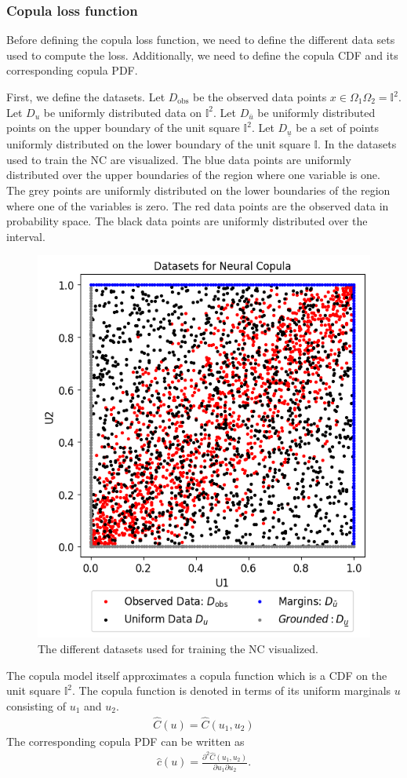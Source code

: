 
\subsubsection{Copula loss function}\label{sec:NeuralCopulaLoss}
Before defining the copula loss function, we need to define the different data sets used to compute the loss. Additionally, we need to define the copula \gls{CDF} and its corresponding copula \gls{PDF}. 

First, we define the datasets. Let $D_{\mathrm{obs}}$ be the observed data points $x \in \Omega_1\Omega_2  = \mathbb{I}^2$. Let $D_{u}$ be uniformly distributed data on $\mathbb{I}^2$. Let $D_{\bar{u}}$ be uniformly distributed points on the upper boundary of the unit square $\mathbb{I}^2$. Let $D_{\underline{u}}$ be a set of points uniformly distributed on the lower boundary of the unit square $\mathbb{I}$. In  the datasets used to train the \gls{NC} are visualized. The blue data points are uniformly distributed over the upper boundaries of the region where one variable is one. The grey points are uniformly distributed on the lower boundaries of the region where one of the variables is zero. The red data points are the observed data in probability space. The black data points are uniformly distributed over the interval. 

\begin{figure}
    \centering
    \includegraphics[width=0.5\linewidth]{3Theory/pictures/DatasetsNC.png}
    \caption{The different datasets used for training the \gls{NC} visualized.}
    \label{fig:datasetsNC}
\end{figure}

The copula model itself approximates a copula function which is a \gls{CDF} on the unit square $\mathbb{I}^2$. The copula function is denoted in terms of its uniform marginals $u$ consisting of $u_1$ and $u_2$. 
\begin{align*}
    \hat{C}(u) = \hat{C}(u_1,u_2) 
\end{align*}
The corresponding copula \gls{PDF} can be written as  
\begin{align*}
    \hat{c}(u) = \frac{\partial^2 \hat{C}(u_1,u_2)}{\partial u_1 \partial u_2}. 
\end{align*}
 
